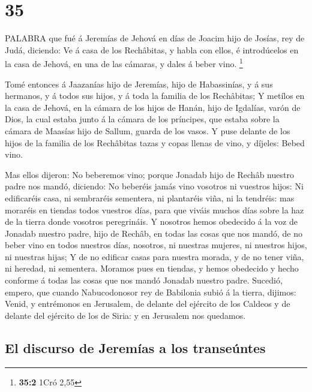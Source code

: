 \hypertarget{section-34}{%
\section{35}\label{section-34}}

 PALABRA que fué á Jeremías de Jehová en días de Joacim hijo
de Josías, rey de Judá, diciendo:  Ve á casa de los
Rechâbitas, y habla con ellos, é introdúcelos en la casa de Jehová, en
una de las cámaras, y dales á beber vino. \footnote{\textbf{35:2} 1Cró
  2,55}

 Tomé entonces á Jaazanías hijo de Jeremías, hijo de
Habassinías, y á sus hermanos, y á todos sus hijos, y á toda la familia
de los Rechâbitas;  Y metílos en la casa de Jehová, en la
cámara de los hijos de Hanán, hijo de Igdalías, varón de Dios, la cual
estaba junto á la cámara de los príncipes, que estaba sobre la cámara de
Maasías hijo de Sallum, guarda de los vasos.  Y puse delante
de los hijos de la familia de los Rechâbitas tazas y copas llenas de
vino, y díjeles: Bebed vino.

 Mas ellos dijeron: No beberemos vino; porque Jonadab hijo
de Rechâb nuestro padre nos mandó, diciendo: No beberéis jamás vino
vosotros ni vuestros hijos:  Ni edificaréis casa, ni
sembraréis sementera, ni plantaréis viña, ni la tendréis: mas moraréis
en tiendas todos vuestros días, para que viváis muchos días sobre la haz
de la tierra donde vosotros peregrináis.  Y nosotros hemos
obedecido á la voz de Jonadab nuestro padre, hijo de Rechâb, en todas
las cosas que nos mandó, de no beber vino en todos nuestros días,
nosotros, ni nuestras mujeres, ni nuestros hijos, ni nuestras hijas;
 Y de no edificar casas para nuestra morada, y de no tener
viña, ni heredad, ni sementera.  Moramos pues en tiendas, y
hemos obedecido y hecho conforme á todas las cosas que nos mandó Jonadab
nuestro padre.  Sucedió, empero, que cuando Nabucodonosor
rey de Babilonia subió á la tierra, dijimos: Venid, y entrémonos en
Jerusalem, de delante del ejército de los Caldeos y de delante del
ejército de los de Siria: y en Jerusalem nos quedamos.

\hypertarget{el-discurso-de-jeremuxedas-a-los-transeuxfantes}{%
\subsection{El discurso de Jeremías a los
transeúntes}\label{el-discurso-de-jeremuxedas-a-los-transeuxfantes}}


